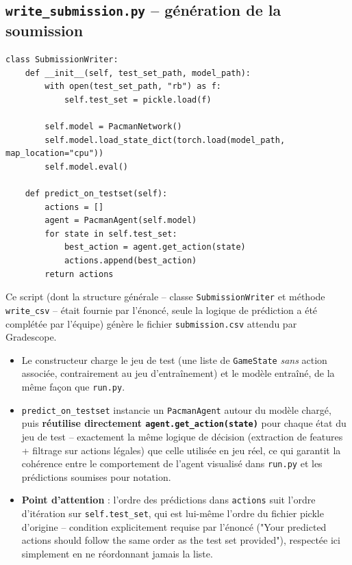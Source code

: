 \documentclass[a4paper,12pt]{article}
\begin{document}
\subsection{\texttt{write\_submission.py} -- génération de la soumission}

\begin{lstlisting}
class SubmissionWriter:
    def __init__(self, test_set_path, model_path):
        with open(test_set_path, "rb") as f:
            self.test_set = pickle.load(f)

        self.model = PacmanNetwork()
        self.model.load_state_dict(torch.load(model_path, map_location="cpu"))
        self.model.eval()

    def predict_on_testset(self):
        actions = []
        agent = PacmanAgent(self.model)
        for state in self.test_set:
            best_action = agent.get_action(state)
            actions.append(best_action)
        return actions
\end{lstlisting}

Ce script (dont la structure générale -- classe \texttt{SubmissionWriter}
et méthode \texttt{write\_csv} -- était fournie par l'énoncé, seule la
logique de prédiction a été complétée par l'équipe) génère le fichier
\texttt{submission.csv} attendu par Gradescope.

\begin{itemize}
    \item Le constructeur charge le jeu de test (une liste de
    \texttt{GameState} \emph{sans} action associée, contrairement au jeu
    d'entraînement) et le modèle entraîné, de la même façon que
    \texttt{run.py}.
    \item \texttt{predict\_on\_testset} instancie un \texttt{PacmanAgent}
    autour du modèle chargé, puis \textbf{réutilise directement
    \texttt{agent.get\_action(state)}} pour chaque état du jeu de test --
    exactement la même logique de décision (extraction de features +
    filtrage sur actions légales) que celle utilisée en jeu réel, ce qui
    garantit la cohérence entre le comportement de l'agent visualisé
    dans \texttt{run.py} et les prédictions soumises pour notation.
    \item \textbf{Point d'attention} : l'ordre des prédictions dans
    \texttt{actions} suit l'ordre d'itération sur
    \texttt{self.test\_set}, qui est lui-même l'ordre du fichier pickle
    d'origine -- condition explicitement requise par l'énoncé
    ("Your predicted actions should follow the same order as the test
    set provided"), respectée ici simplement en ne réordonnant jamais
    la liste.
\end{itemize}
\end{document}

